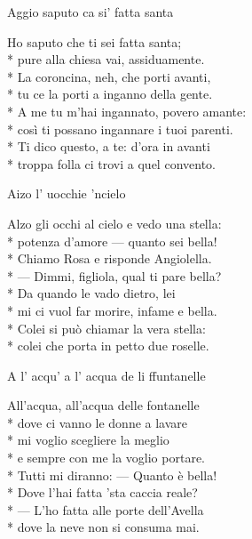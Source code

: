 \documentclass[11pt]{book}
\begin{document}
\begin{poem}{Aggio saputo ca si’ fatta santa}{}
\settowidth{\versewidth}{Così ti possano ingannare i tuoi parenti}
\begin{altverse}
Ho saputo che ti sei fatta santa;\\*
pure alla chiesa vai, assiduamente.\\*
La coroncina, neh, che porti avanti,\\*
tu ce la porti a inganno della gente.\\*
A me tu m’hai ingannato, povero amante:\\*
così ti possano ingannare i tuoi parenti.\\*
Ti dico questo, a te: d’ora in avanti\\*
troppa folla ci trovi a quel convento.
\end{altverse}
\end{poem}

\begin{poem}{Aizo l’ uocchie ’ncielo}{}
\settowidth{\versewidth}{Alzo gli occhi al cielo e vedo una stella}
\begin{altverse}
Alzo gli occhi al cielo e vedo una stella:\\*
potenza d’amore — quanto sei bella!\\*
Chiamo Rosa e risponde Angiolella.\\*
— Dimmi, figliola, qual ti pare bella?\\*
Da quando le vado dietro, lei\\*
mi ci vuol far morire, infame e bella.\\*
Colei si può chiamar la vera stella:\\*
colei che porta in petto due roselle.
\end{altverse}
\end{poem}

\begin{poem}{A l’ acqu’ a l’ acqua de li ffuntanelle}{}
\settowidth{\versewidth}{All’acqua, all’acqua delle fontanelle}
\begin{altverse}
All’acqua, all’acqua delle fontanelle\\*
dove ci vanno le donne a lavare\\*
mi voglio scegliere la meglio\\*
e sempre con me la voglio portare.\\*
Tutti mi diranno: — Quanto è bella!\\*
Dove l’hai fatta ’sta caccia reale?\\*
— L’ho fatta alle porte dell’Avella\\*
dove la neve non si consuma mai.
\end{altverse}
\end{poem}
\end{document}
